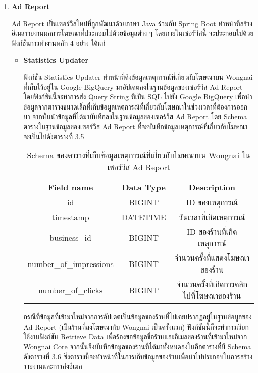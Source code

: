 \begin{enumerate}
	\item \textbf{Ad Report}
	
	Ad Report เป็นเซอร์วิสใหม่ที่ถูกพัฒนาด้วยภาษา Java ร่วมกับ Spring Boot ทำหน้าที่สร้างอีเมลรายงานผลการโฆษณาที่ประกอบไปด้วยข้อมูลต่าง ๆ โดยภายในเซอร์วิสนี้ จะประกอบไปด้วยฟังก์ชันการทำงานหลัก 4 อย่าง ได้แก่
	\begin{itemize}
		\item \textbf{Statistics Updater}
		
		ฟังก์ชัน Statistics Updater ทำหน้าที่ดึงข้อมูลเหตุการณ์ที่เกี่ยวกับโฆษณาบน Wongnai ที่เก็บไว้อยู่ใน Google BigQuery มาอัปเดตลงในฐานข้อมูลของเซอร์วิส Ad Report โดยฟังก์ชันนี้จะทำการส่ง Query String ที่เป็น SQL ไปยัง Google BigQuery เพื่อนำข้อมูลจากตารางขนาดเล็กที่เก็บข้อมูลเหตุการณ์ที่เกี่ยวกับโฆษณาในช่วงเวลาที่ต้องการออกมา จากนั้นนำข้อมูลที่ได้มาบันทึกลงในฐานข้อมูลของเซอร์วิส Ad Report โดย Schema ตารางในฐานข้อมูลของเซอร์วิส Ad Report ที่จะบันทึกข้อมูลเหตุการณ์ที่เกี่ยวกับโฆษณา จะเป็นไปดังตารางที่ 3.5
		
		\begin{table}[!h]
			\centering
			\begin{tabular}{|c|c|c|}
				\hline
				\textbf{Field name} & \textbf{Data Type} & \textbf{Description} \\ \hline
				id & BIGINT & ID ของเหตุการณ์ \\ \hline
				timestamp & DATETIME & วันเวลาที่เกิดเหตุการณ์ \\ \hline
				business\_id & BIGINT & ID ของร้านที่เกิดเหตุการณ์ \\ \hline
				number\_of\_impressions & BIGINT & จำนวนครั้งที่แสดงโฆษณาของร้าน \\ \hline
				number\_of\_clicks & BIGINT & จำนวนครั้งที่เกิดการคลิกไปที่โฆษณาของร้าน \\ \hline
			\end{tabular}
			\caption{Schema ของตารางที่เก็บข้อมูลเหตุการณ์ที่เกี่ยวกับโฆษณาบน Wongnai ในเซอร์วิส Ad Report}
			\label{Table:schema-ad-report-1}
		\end{table}
		
		กรณีที่ข้อมูลที่เข้ามาใหม่จากการอัปเดตเป็นข้อมูลของร้านที่ไม่เคยปรากฏอยู่ในฐานข้อมูลของ Ad Report (เป็นร้านที่ลงโฆษณากับ Wongnai เป็นครั้งแรก) ฟังก์ชันนี้ก็จะทำการเรียกใช้งานฟังก์ชัน Retrieve Data เพื่อร้องขอข้อมูลชื่อร้านและอีเมลของร้านที่เข้ามาใหม่จาก Wongnai Core จากนั้นจึงบันทึกข้อมูลของร้านที่ได้มาทั้งหมดลงในอีกตารางที่มี Schema ดังตารางที่ 3.6 ซึ่งตารางนี้จะทำหน้าที่ในการเก็บข้อมูลของร้านเพื่อนำไปประกอบในการสร้างรายงานและการส่งอีเมล 
		

\end{itemize}
\end{enumerate}

